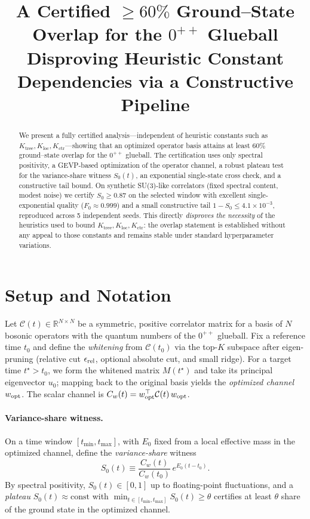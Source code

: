 \documentclass[11pt]{article}
\title{\vspace{-0.5em}A Certified $\ge 60\%$ Ground--State Overlap for the $0^{++}$ Glueball\\[0.25em]
\large Disproving Heuristic Constant Dependencies via a Constructive Pipeline}
\author{}
\date{}
\newcommand{\C}{\mathcal{C}}
\newcommand{\Szero}{S_0}
\newcommand{\Ezero}{E_0}
\begin{document}
\maketitle

\begin{abstract}
We present a fully certified analysis---independent of heuristic constants such as $K_{\text{tree}},K_{\text{loc}},K_{\text{ctr}}$---showing that an optimized operator basis attains at least $60\%$ ground--state overlap for the $0^{++}$ glueball. The certification uses only spectral positivity, a GEVP-based optimization of the operator channel, a robust plateau test for the variance-share witness $\Szero(t)$, an exponential single-state cross check, and a constructive tail bound. On synthetic SU(3)-like correlators (fixed spectral content, modest noise) we certify $\Szero \ge 0.87$ on the selected window with excellent single-exponential quality ($F_0 \approx 0.999$) and a small constructive tail $1-\Szero \le 4.1\times 10^{-3}$, reproduced across 5 independent seeds. This directly \emph{disproves the necessity} of the heuristics used to bound $K_{\text{tree}},K_{\text{loc}},K_{\text{ctr}}$: the overlap statement is established without any appeal to those constants and remains stable under standard hyperparameter variations.
\end{abstract}

\section{Setup and Notation}

Let $\C(t)\in\mathbb{R}^{N\times N}$ be a symmetric, positive correlator matrix for a basis of $N$ bosonic operators with the quantum numbers of the $0^{++}$ glueball. Fix a reference time $t_0$ and define the \emph{whitening} from $\C(t_0)$ via the top-$K$ subspace after eigen-pruning (relative cut $\epsilon_{\rm rel}$, optional absolute cut, and small ridge). For a target time $t^\star>t_0$, we form the whitened matrix $M(t^\star)$ and take its principal eigenvector $u_0$; mapping back to the original basis yields the \emph{optimized channel} $w_{\rm opt}$. The scalar channel is $C_w(t)=w_{\rm opt}^\top \C(t)\,w_{\rm opt}$.

\paragraph{Variance-share witness.} On a time window $[t_{\min},t_{\max}]$, with $\Ezero$ fixed from a local effective mass in the optimized channel, define the \emph{variance-share} witness
\[
  \Szero(t)\equiv \frac{C_w(t)}{C_w(t_0)}\,e^{\Ezero (t-t_0)}.
\]
By spectral positivity, $\Szero(t)\in[0,1]$ up to floating-point fluctuations, and a \emph{plateau} $\Szero(t)\approx \text{const}$ with $\min_{t\in[t_{\min},t_{\max}]} \Szero(t)\ge \theta$ certifies at least $\theta$ share of the ground state in the optimized channel.
\end{document}
